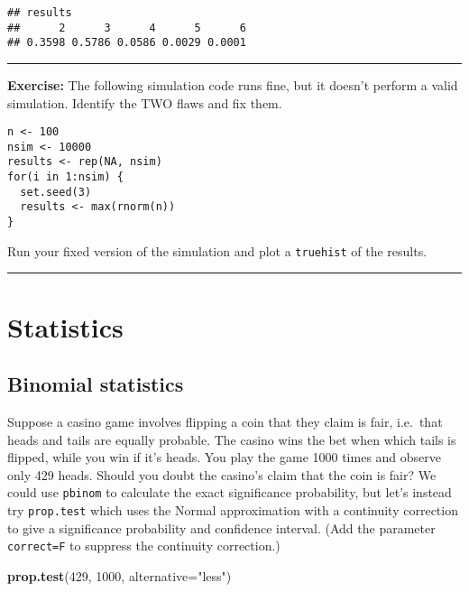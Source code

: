 \documentclass[]{book}
\newenvironment{Shaded}{\begin{snugshade}}{\end{snugshade}}
\newcommand{\DataTypeTok}[1]{\textcolor[rgb]{0.13,0.29,0.53}{#1}}
\newcommand{\DecValTok}[1]{\textcolor[rgb]{0.00,0.00,0.81}{#1}}
\newcommand{\KeywordTok}[1]{\textcolor[rgb]{0.13,0.29,0.53}{\textbf{#1}}}
\newcommand{\NormalTok}[1]{#1}
\newcommand{\StringTok}[1]{\textcolor[rgb]{0.31,0.60,0.02}{#1}}
\theoremstyle{definition}
\theoremstyle{definition}
\theoremstyle{definition}
\theoremstyle{remark}
\begin{document}
\begin{verbatim}
## results
##      2      3      4      5      6 
## 0.3598 0.5786 0.0586 0.0029 0.0001
\end{verbatim}

\begin{center}\rule{0.5\linewidth}{\linethickness}\end{center}

\textbf{Exercise:} The following simulation code runs fine, but it
doesn't perform a valid simulation. Identify the TWO flaws and fix them.

\begin{verbatim}
n <- 100
nsim <- 10000
results <- rep(NA, nsim)
for(i in 1:nsim) {
  set.seed(3)
  results <- max(rnorm(n))
}
\end{verbatim}

Run your fixed version of the simulation and plot a \texttt{truehist} of
the results.

\begin{center}\rule{0.5\linewidth}{\linethickness}\end{center}

\hypertarget{statistics}{%
\chapter{Statistics}\label{statistics}}

\hypertarget{binomial-statistics}{%
\section{Binomial statistics}\label{binomial-statistics}}

Suppose a casino game involves flipping a coin that they claim is fair,
i.e.~that heads and tails are equally probable. The casino wins the bet
when which tails is flipped, while you win if it's heads. You play the
game 1000 times and observe only 429 heads. Should you doubt the
casino's claim that the coin is fair? We could use \texttt{pbinom} to
calculate the exact significance probability, but let's instead try
\texttt{prop.test} which uses the Normal approximation with a continuity
correction to give a significance probability and confidence interval.
(Add the parameter \texttt{correct=F} to suppress the continuity
correction.)

\begin{Shaded}
\begin{Highlighting}[]
\KeywordTok{prop.test}\NormalTok{(}\DecValTok{429}\NormalTok{, }\DecValTok{1000}\NormalTok{, }\DataTypeTok{alternative=}\StringTok{"less"}\NormalTok{)}
\end{Highlighting}
\end{Shaded}
\end{document}

